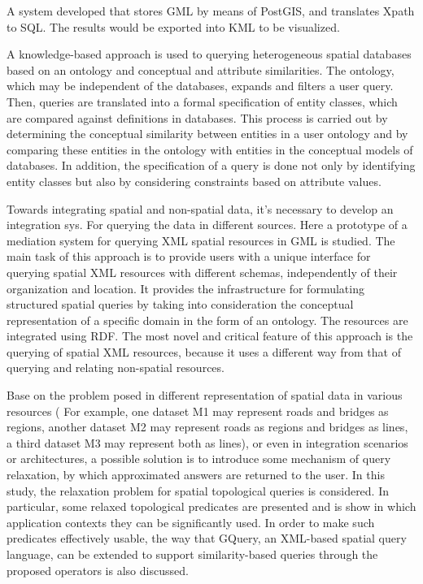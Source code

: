 \cite{Alemdros2011} A system developed that stores GML by means of PostGIS, and translates Xpath to SQL.
The results would be exported into KML to be visualized.

\cite{Gutierrez2004} A knowledge-based approach is used to querying heterogeneous spatial databases based on an ontology and conceptual and attribute similarities. The ontology, which may be independent of the databases, expands and filters a user query. Then, queries are translated into a formal specification of entity classes, which are compared against definitions in databases. This process is carried out by determining the conceptual similarity between entities in a user ontology and by comparing these entities in the ontology with entities in the conceptual models of databases. In addition, the speciﬁcation of a query is done not only by identifying entity classes but also by considering constraints based on attribute values.

\cite{corcoles2004} Towards integrating spatial and non-spatial data, it's necessary to develop an integration sys. For querying the data in different sources. Here a prototype of a mediation system for querying XML spatial resources in GML is studied.  The main task of this approach is to provide users with a unique interface for querying spatial XML resources with different schemas, independently of their organization and location. It provides the infrastructure for formulating structured spatial queries by taking into consideration the conceptual representation of a specific domain in the form of an ontology. The resources are integrated using RDF. The most novel and critical feature of this approach is the querying of spatial XML resources, because it uses a different way from that of querying and relating non-spatial resources.

\cite{belussi2006} Base on the problem posed in different representation of spatial data in various resources ( For example, one dataset M1 may represent roads and bridges as regions, another dataset M2 may represent roads as regions and bridges as lines, a third dataset M3 may represent both as lines), or even in integration scenarios or architectures, a possible solution is to introduce some mechanism of query relaxation, by which approximated answers are returned to the user. In this study, the relaxation problem for spatial topological queries is considered. In particular,  some relaxed topological predicates are presented and is show in which application contexts they can be significantly used. In order to make such predicates effectively usable, the way that GQuery, an XML-based spatial query language, can be extended to support similarity-based queries through the proposed operators is also discussed.

